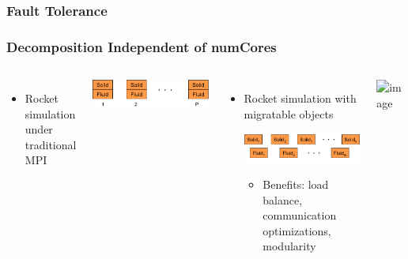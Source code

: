 \begin{frame}[t]
  \frametitle{Fault Tolerance}
\end{frame}

\begin{frame}[t]
\frametitle{Decomposition Independent of numCores}
  \begin{columns}
    \begin{itemize}
      \item Rocket simulation under traditional MPI
    \end{itemize}
    \begin{center} \includegraphics[width=.6\textwidth]{figures/rocket_mpi} \end{center}
    \pause
    \begin{itemize}
      \item Rocket simulation with migratable objects
      \begin{center} \includegraphics[width=.6\textwidth]{figures/rocket_charm} \end{center}
      \begin{itemize}
        \item Benefits: load balance, communication optimizations, modularity
      \end{itemize}
    \end{itemize}
     {
    \vfill
    \begin{center} \includegraphics<0->[width=\textwidth]{figures/rocket.png} \end{center}
    \vfill
    }
  \end{columns}
\end{frame}





